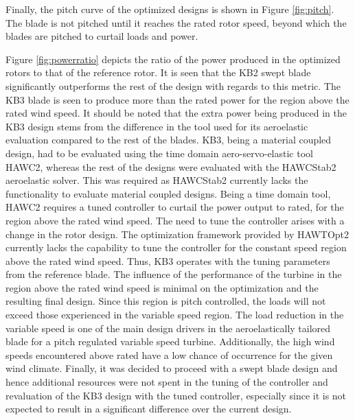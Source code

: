 Finally, the pitch curve of the optimized designs is shown in Figure \ref{fig:pitch}. The blade is not pitched until it reaches the rated rotor speed, beyond which the blades are pitched to curtail loads and power.

Figure \ref{fig:powerratio} depicts the ratio of the power produced in the optimized rotors to that of the reference rotor. It is seen that the KB2 swept blade significantly outperforms the rest of the design with regards to this metric. The KB3 blade is seen to produce more than the rated power for the region above the rated wind speed.  
It should be noted that the extra power being produced in the KB3 design stems from the difference in the tool used for its aeroelastic evaluation compared to the rest of the blades. KB3, being a material coupled design, had to be evaluated using the time domain aero-servo-elastic tool HAWC2, whereas the rest of the designs were evaluated with the HAWCStab2 aeroelastic solver. This was required as HAWCStab2 currently lacks the functionality to evaluate material coupled designs. Being a time domain tool, HAWC2 requires a tuned controller to curtail the power output to rated, for the region above the rated wind speed. The need to tune the controller arises with a change in the rotor design. The optimization framework provided by HAWTOpt2 currently lacks the capability to tune the controller for the constant speed region above the rated wind speed. Thus, KB3 operates with the tuning parameters from the reference blade. The influence of the performance of the turbine in the region above the rated wind speed is minimal on the optimization and the resulting final design. Since this region is pitch controlled, the loads will not exceed those experienced in the variable speed region. The load reduction in the variable speed is one of the main design drivers in the aeroelastically tailored blade for a pitch regulated variable speed turbine. Additionally, the high wind speeds encountered above rated have a low chance of occurrence for the given wind climate. Finally, it was decided to proceed with a swept blade design and hence additional resources were not spent in the tuning of the controller and revaluation of the KB3 design with the tuned controller, especially since it is not expected to result in a significant difference over the current design.


